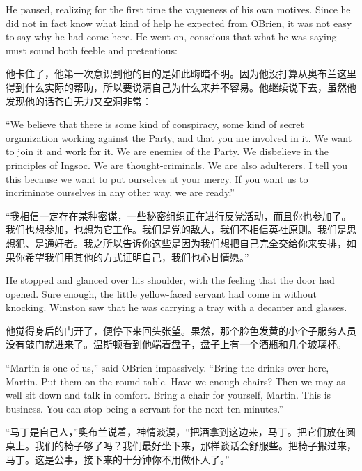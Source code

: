 \begin{paracol}{2}
He paused, realizing for the first time the vagueness of his own
motives. Since he did not in fact know what kind of help he expected
from O\textquotesingle Brien, it was not easy to say why he had come
here. He went on, conscious that what he was saying must sound both
feeble and pretentious:

\switchcolumn

他卡住了，他第一次意识到他的目的是如此晦暗不明。因为他没打算从奥布兰这里得到什么实际的帮助，所以要说清自己为什么来并不容易。他继续说下去，虽然他发现他的话苍白无力又空洞非常：

\switchcolumn*

``We believe that there is some kind of conspiracy, some kind of secret
organization working against the Party, and that you are involved in it.
We want to join it and work for it. We are enemies of the Party. We
disbelieve in the principles of Ingsoc. We are thought-criminals. We are
also adulterers. I tell you this because we want to put ourselves at
your mercy. If you want us to incriminate ourselves in any other way, we
are ready.''

\switchcolumn

``我相信一定存在某种密谋，一些秘密组织正在进行反党活动，而且你也参加了。我们也想参加，也想为它工作。我们是党的敌人，我们不相信英社原则。我们是思想犯、是通奸者。我之所以告诉你这些是因为我们想把自己完全交给你来安排，如果你希望我们用其他的方式证明自己，我们也心甘情愿。''

\switchcolumn*

He stopped and glanced over his shoulder, with the feeling that the door
had opened. Sure enough, the little yellow-faced servant had come in
without knocking. Winston saw that he was carrying a tray with a
decanter and glasses.

\switchcolumn

他觉得身后的门开了，便停下来回头张望。果然，那个脸色发黄的小个子服务人员没有敲门就进来了。温斯顿看到他端着盘子，盘子上有一个酒瓶和几个玻璃杯。

\switchcolumn*

``Martin is one of us,'' said O\textquotesingle Brien impassively. ``Bring
the drinks over here, Martin. Put them on the round table. Have we
enough chairs? Then we may as well sit down and talk in comfort. Bring a
chair for yourself, Martin. This is business. You can stop being a
servant for the next ten minutes.''

\switchcolumn

``马丁是自己人，''奥布兰说着，神情淡漠，``把酒拿到这边来，马丁。把它们放在圆桌上。我们的椅子够了吗？我们最好坐下来，那样谈话会舒服些。把椅子搬过来，马丁。这是公事，接下来的十分钟你不用做仆人了。''


\end{paracol}
